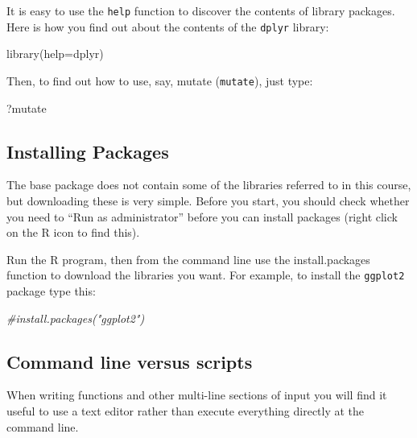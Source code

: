 \documentclass[
]{book}
\newenvironment{Shaded}{\begin{snugshade}}{\end{snugshade}}
\newcommand{\AttributeTok}[1]{\textcolor[rgb]{0.77,0.63,0.00}{#1}}
\newcommand{\CommentTok}[1]{\textcolor[rgb]{0.56,0.35,0.01}{\textit{#1}}}
\newcommand{\FunctionTok}[1]{\textcolor[rgb]{0.00,0.00,0.00}{#1}}
\newcommand{\NormalTok}[1]{#1}
\theoremstyle{definition}
\theoremstyle{definition}
\theoremstyle{definition}
\theoremstyle{definition}
\theoremstyle{remark}
\begin{document}
It is easy to use the \texttt{help} function to discover the contents of library packages. Here is how you find out about the contents of the \texttt{dplyr} library:

\begin{Shaded}
\begin{Highlighting}[]
\FunctionTok{library}\NormalTok{(}\AttributeTok{help=}\NormalTok{dplyr)}
\end{Highlighting}
\end{Shaded}

Then, to find out how to use, say, mutate (\texttt{mutate}), just type:

\begin{Shaded}
\begin{Highlighting}[]
\NormalTok{?mutate}
\end{Highlighting}
\end{Shaded}

\hypertarget{installing-packages}{%
\subsection{Installing Packages}\label{installing-packages}}

The base package does not contain some of the libraries referred to in this course, but downloading these is very simple. Before you start, you should check whether you need to ``Run as administrator'' before you can install packages (right click on the R icon to find this).

Run the R program, then from the command line use the install.packages function to download the libraries you want. For example, to install the \texttt{ggplot2} package type this:

\begin{Shaded}
\begin{Highlighting}[]
\CommentTok{\#install.packages("ggplot2")}
\end{Highlighting}
\end{Shaded}

\hypertarget{command-line-versus-scripts}{%
\subsection{Command line versus scripts}\label{command-line-versus-scripts}}

When writing functions and other multi-line sections of input you will find it useful to use a text editor rather than execute everything directly at the command line.
\end{document}

